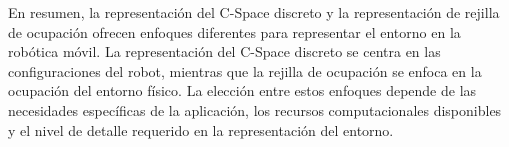 \documentclass{article}
\begin{document}
\begin{itemize}
En resumen, la representación del C-Space discreto y la representación de rejilla de ocupación ofrecen enfoques diferentes para representar el entorno en la robótica móvil. La representación del C-Space discreto se centra en las configuraciones del robot, mientras que la rejilla de ocupación se enfoca en la ocupación del entorno físico. La elección entre estos enfoques depende de las necesidades específicas de la aplicación, los recursos computacionales disponibles y el nivel de detalle requerido en la representación del entorno.

\end{itemize}
\end{document}
